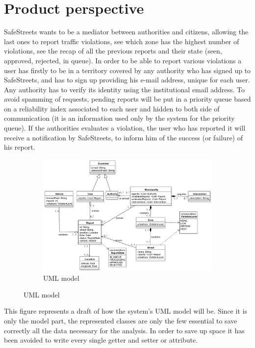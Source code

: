 \documentclass[12pt,a4paper]{report}
\begin{document}
	\section{Product perspective}
		SafeStreets wants to be a mediator between authorities and citizens, allowing the last ones to report traffic violations, see which zone has the highest number of violations, see the recap of all the previous reports and their state
		(seen, approved, rejected, in queue). In order to be able to report various violations a user has firstly to be in a
		territory covered by any authority who has signed up to SafeStreets, and has to sign up providing his e-mail address, unique for each user. Any authority has to verify its identity using the institutional email address.
		To avoid spamming of requests, pending reports will be put in a priority queue based 
		on a reliability index associated to each user and hidden to both side of communication (it is an information used only by 
		the system for the priority queue). If the authorities evaluates a violation, the user who has reported it
		will receive a notification by SafeStreets, to inform him of the success (or failure) of his report. 
		\begin{figure}[H]
			\begin{subfigure}{\textwidth}
				\includegraphics[scale = 0.65, center]{uml}
				\caption{UML model}
				\label{UML model }
			\end{subfigure}
		\end{figure}
		This figure represents a draft of how the system's UML model will be. Since it is only the model part, the represented classes are only the few essential to save correctly all the data necessary for the analysis. In order to save up space it has been avoided to write every single getter and setter or attribute.
\end{document}
